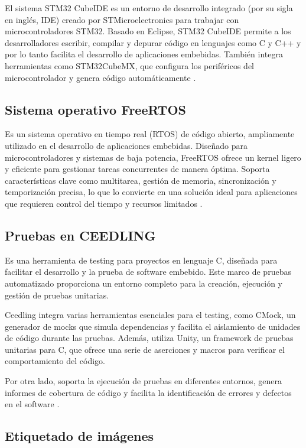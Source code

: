 El sistema STM32 CubeIDE es un entorno de desarrollo integrado (por su sigla en inglés, IDE) creado por STMicroelectronics para trabajar con microcontroladores STM32. Basado en Eclipse, STM32 CubeIDE permite a los desarrolladores escribir, compilar y depurar código en lenguajes como C y C++ y por lo tanto facilita el desarrollo de aplicaciones embebidas. También integra herramientas como STM32CubeMX, que configura los periféricos del microcontrolador y genera código automáticamente \citep{WEBSITE:stm32}.

\subsection{Sistema operativo FreeRTOS}
\label{subsec:FreeRTOS}

Es un sistema operativo en tiempo real (RTOS) de código abierto, ampliamente utilizado en el desarrollo de aplicaciones embebidas. Diseñado para microcontroladores y sistemas de baja potencia, FreeRTOS ofrece un kernel ligero y eficiente para gestionar tareas concurrentes de manera óptima. Soporta características clave como multitarea, gestión de memoria, sincronización y temporización precisa, lo que lo convierte en una solución ideal para aplicaciones que requieren control del tiempo y recursos limitados \citep{WEBSITE:freertos}.

\subsection{Pruebas en CEEDLING}
\label{subsec:CEEDLING}

Es una herramienta de testing para proyectos en lenguaje C, diseñada para facilitar el desarrollo y la prueba de software embebido. Este marco de pruebas automatizado proporciona un entorno completo para la creación, ejecución y gestión de pruebas unitarias.

Ceedling integra varias herramientas esenciales para el testing, como CMock, un generador de mocks que simula dependencias y facilita el aislamiento de unidades de código durante las pruebas. Además, utiliza Unity, un framework de pruebas unitarias para C, que ofrece una serie de aserciones y macros para verificar el comportamiento del código.

Por otra lado, soporta la ejecución de pruebas en diferentes entornos, genera informes de cobertura de código y facilita la identificación de errores y defectos en el software \citep{WEBSITE:CEEDLING}.

\subsection{Etiquetado de imágenes}
\label{subsec:etiquetado}

